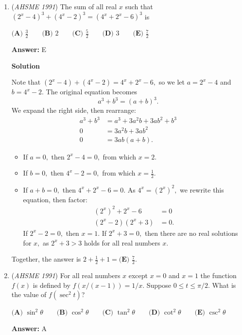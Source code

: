 \begin{enumerate}
	\item (\textit{AHSME 1991}) The sum of all real $x$ such that $(2^x-4)^3+(4^x-2)^3=(4^x+2^x-6)^3$ is


 $\textbf{(A) } \frac32 \qquad \textbf{(B) } 2 \qquad \textbf{(C) } \frac52 \qquad \textbf{(D) } 3 \qquad \textbf{(E) } \frac72$

 \textbf{Answer: }E



\textbf{Solution}

Note that $(2^x-4)+(4^x-2)=4^x+2^x-6,$ so we let $a=2^x-4$ and $b=4^x-2.$ The original equation becomes 
 \[a^3+b^3=(a+b)^3.\]We expand the right side, then rearrange:
 \begin{align*} a^3+b^3 &= a^3+3a^2b+3ab^2+b^3 \\ 0 &= 3a^2b+3ab^2 \\ 0 &= 3ab(a+b). \end{align*}


            \begin{itemize} 
        \item If $a=0,$ then $2^x-4=0,$ from which $x=2.$

        \item If $b=0,$ then $4^x-2=0,$ from which $x=\frac12.$

        \item If $a+b=0,$ then $4^x+2^x-6=0.$ As $4^x=(2^x)^2,$ we rewrite this equation, then factor:
 \begin{align*} (2^x)^2+2^x-6&=0 \\ (2^x-2)(2^x+3)&=0. \end{align*}
If $2^x-2=0,$ then $x=1.$ If $2^x+3=0,$ then there are no real solutions for $x,$ as $2^x+3>3$ holds for all real numbers $x.$


            \end{itemize}
            Together, the answer is $2+\frac12+1=\boxed{\textbf{(E) } \frac72}.$



	\item (\textit{AHSME 1991}) For all real numbers $x$ except $x=0$ and $x=1$ the function $f(x)$ is defined by $f(x/(x-1))=1/x$. Suppose $0\leq t\leq \pi/2$. What is the value of $f(\sec^2t)$?


 $\textbf{(A) } \sin^2\theta\qquad \textbf{(B) } \cos^2\theta\qquad \textbf{(C) } \tan^2\theta\qquad \textbf{(D) } \cot^2\theta\qquad \textbf{(E) } \csc^2\theta$

 \textbf{Answer: }A




\end{enumerate}
